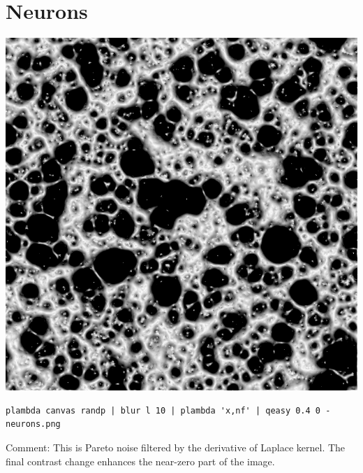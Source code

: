 \section{Neurons}
\includegraphics{neurons.png}
\begin{verbatim}
plambda canvas randp | blur l 10 | plambda 'x,nf' | qeasy 0.4 0 - neurons.png
\end{verbatim}
Comment: This is Pareto noise filtered by the derivative of Laplace kernel.
The final contrast change enhances the near-zero part of the image.

